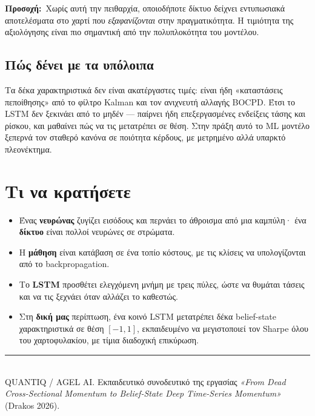 \documentclass[11pt]{article}
\newcommand{\warnb}[1]{\par\medskip\noindent\colorbox{soft}{\parbox{\dimexpr\linewidth-2\fboxsep}{\textcolor{warn}{\textbf{Προσοχή:}}\ #1}}\par\medskip}
\begin{document}
\warnb{Χωρίς αυτή την πειθαρχία, οποιοδήποτε δίκτυο δείχνει εντυπωσιακά αποτελέσματα στο χαρτί που
\emph{εξαφανίζονται} στην πραγματικότητα. Η τιμιότητα της αξιολόγησης είναι πιο σημαντική από την
πολυπλοκότητα του μοντέλου.}

\subsection{Πώς δένει με τα υπόλοιπα}
Τα δέκα χαρακτηριστικά δεν είναι ακατέργαστες τιμές: είναι ήδη «καταστάσεις πεποίθησης» από το φίλτρο
Kalman και τον ανιχνευτή αλλαγής BOCPD. Έτσι το LSTM δεν ξεκινάει από το μηδέν --- παίρνει ήδη
επεξεργασμένες ενδείξεις τάσης και ρίσκου, και μαθαίνει πώς να τις μετατρέπει σε θέση. Στην πράξη αυτό
το ML μοντέλο ξεπερνά τον σταθερό κανόνα σε ποιότητα κέρδους, με μετρημένο αλλά υπαρκτό πλεονέκτημα.

\section*{Τι να κρατήσετε}
\begin{itemize}[nosep,leftmargin=1.4em]
\item Ένας \textbf{νευρώνας} ζυγίζει εισόδους και περνάει το άθροισμα από μια καμπύλη· ένα \textbf{δίκτυο} είναι πολλοί νευρώνες σε στρώματα.
\item Η \textbf{μάθηση} είναι κατάβαση σε ένα τοπίο κόστους, με τις κλίσεις να υπολογίζονται από το backpropagation.
\item Το \textbf{LSTM} προσθέτει ελεγχόμενη μνήμη με τρεις πύλες, ώστε να θυμάται τάσεις και να τις ξεχνάει όταν αλλάζει το καθεστώς.
\item Στη \textbf{δική μας} περίπτωση, ένα κοινό LSTM μετατρέπει δέκα belief-state χαρακτηριστικά σε θέση $[-1,1]$, εκπαιδευμένο να μεγιστοποιεί τον Sharpe όλου του χαρτοφυλακίου, με τίμια διαδοχική επικύρωση.
\end{itemize}

\vfill
\noindent\rule{\linewidth}{0.4pt}\\[2pt]
{\small QUANTIQ / AGEL AI. Εκπαιδευτικό συνοδευτικό της εργασίας \emph{«From Dead Cross-Sectional
Momentum to Belief-State Deep Time-Series Momentum»} (Drakos 2026).}
\end{document}

